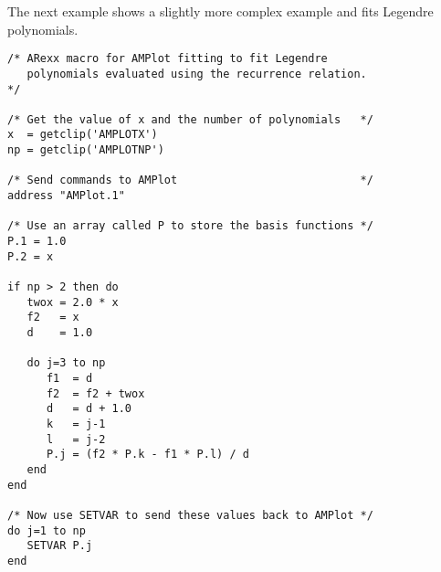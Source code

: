 The next example shows a slightly more complex example and fits Legendre polynomials.

\begin{verbatim}
/* ARexx macro for AMPlot fitting to fit Legendre 
   polynomials evaluated using the recurrence relation.
*/

/* Get the value of x and the number of polynomials   */
x  = getclip('AMPLOTX')
np = getclip('AMPLOTNP')

/* Send commands to AMPlot                            */
address "AMPlot.1"

/* Use an array called P to store the basis functions */
P.1 = 1.0
P.2 = x

if np > 2 then do
   twox = 2.0 * x
   f2   = x
   d    = 1.0
   
   do j=3 to np
      f1  = d
      f2  = f2 + twox
      d   = d + 1.0
      k   = j-1
      l   = j-2
      P.j = (f2 * P.k - f1 * P.l) / d
   end
end

/* Now use SETVAR to send these values back to AMPlot */
do j=1 to np
   SETVAR P.j
end
\end{verbatim}


